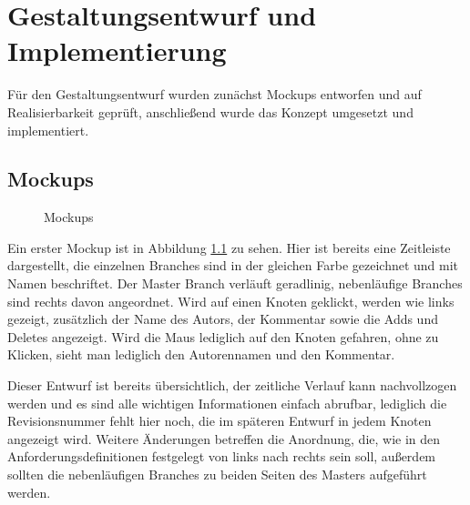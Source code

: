 \documentclass[nocolor]{tudbook}
\begin{document}
\chapter{Gestaltungsentwurf und Implementierung}
Für den Gestaltungsentwurf wurden zunächst Mockups entworfen und auf Realisierbarkeit geprüft, anschließend wurde das Konzept umgesetzt und implementiert.
\section{Mockups}
\begin{figure}
\caption{Mockups}
\label{fig:mockup1}
\end{figure}

Ein erster Mockup ist in Abbildung \ref{fig:mockup1} zu sehen. Hier ist bereits eine Zeitleiste dargestellt, die einzelnen Branches sind in der gleichen Farbe gezeichnet und mit Namen beschriftet. Der Master Branch verläuft geradlinig, nebenläufige Branches sind rechts davon angeordnet. Wird auf einen Knoten geklickt, werden wie links gezeigt, zusätzlich der Name des Autors, der Kommentar sowie die Adds und Deletes angezeigt. Wird die Maus lediglich auf den Knoten gefahren, ohne zu Klicken, sieht man lediglich den Autorennamen und den Kommentar. 

Dieser Entwurf ist bereits übersichtlich, der zeitliche Verlauf kann nachvollzogen werden und es sind alle wichtigen Informationen einfach abrufbar, lediglich die Revisionsnummer fehlt hier noch, die im späteren Entwurf in jedem Knoten angezeigt wird. Weitere Änderungen betreffen die Anordnung, die, wie in den Anforderungsdefinitionen festgelegt von links nach rechts sein soll, außerdem sollten die nebenläufigen Branches zu beiden Seiten des Masters aufgeführt werden.
\end{document}

